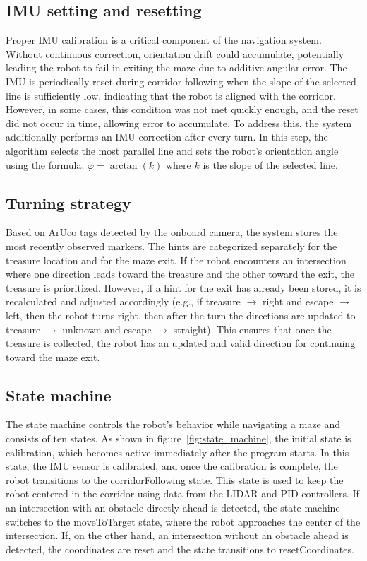 \subsection{IMU setting and resetting}
Proper IMU calibration is a critical component of the navigation system. Without continuous correction, orientation drift could accumulate, potentially leading the robot to fail in exiting the maze due to additive angular error. The IMU is periodically reset during corridor following when the slope of the selected line is sufficiently low, indicating that the robot is aligned with the corridor. However, in some cases, this condition was not met quickly enough, and the reset did not occur in time, allowing error to accumulate. To address this, the system additionally performs an IMU correction after every turn. In this step, the algorithm selects the most parallel line and sets the robot's orientation angle using the formula: \(\varphi = \arctan(k)\) where \(k\) is the slope of the selected line.

\subsection{Turning strategy}
Based on ArUco tags detected by the onboard camera, the system stores the most recently observed markers. The hints are categorized separately for the treasure location and for the maze exit. If the robot encounters an intersection where one direction leads toward the treasure and the other toward the exit, the treasure is prioritized. However, if a hint for the exit has already been stored, it is recalculated and adjusted accordingly (e.g., if treasure $\rightarrow$ right and escape $\rightarrow$ left, then the robot turns right, then after the turn the directions are updated to treasure $\rightarrow$ unknown and escape $\rightarrow$ straight). This ensures that once the treasure is collected, the robot has an updated and valid direction for continuing toward the maze exit.

\subsection{State machine}
The state machine controls the robot's behavior while navigating a maze and consists of ten states. As shown in figure~\ref{fig:state_machine}, the initial state is calibration, which becomes active immediately after the program starts. In this state, the IMU sensor is calibrated, and once the calibration is complete, the robot transitions to the corridorFollowing state. This state is used to keep the robot centered in the corridor using data from the LIDAR and PID controllers. If an intersection with an obstacle directly ahead is detected, the state machine switches to the moveToTarget state, where the robot approaches the center of the intersection. If, on the other hand, an intersection without an obstacle ahead is detected, the coordinates are reset and the state transitions to resetCoordinates.

